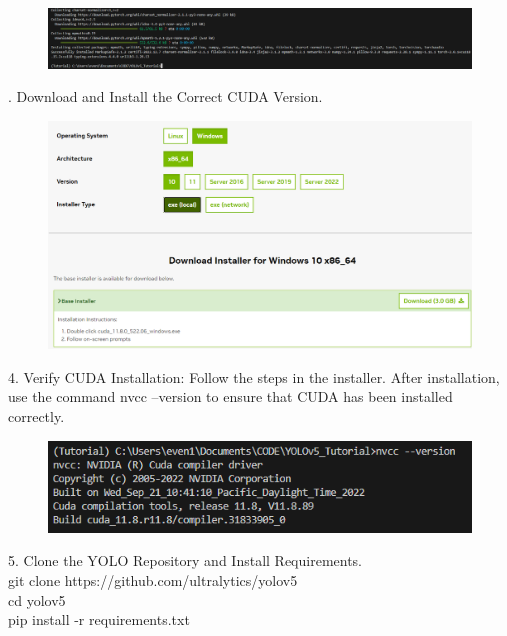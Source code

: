 \begin{figure}[H]
    \centering
    \includegraphics[scale=0.5]{evenbilder/tutorial/tutorial-3.png}
    \label{fig:tutorial-3}
\end{figure}
.	Download and Install the Correct CUDA Version.\\

\begin{figure}[H]
    \centering
    \includegraphics[scale=0.5]{evenbilder/tutorial/tutorial-4.png}
    \label{fig:tutorial-4}
\end{figure}

4.	Verify CUDA Installation: Follow the steps in the installer. After installation, use the command nvcc --version to ensure that CUDA has been installed correctly.\\

\begin{figure}[H]
    \centering
    \includegraphics[scale=0.5]{evenbilder/tutorial/tutorial-5.png}
    \label{fig:tutorial-5}
\end{figure}

5.	Clone the YOLO Repository and Install Requirements.\\

git clone https://github.com/ultralytics/yolov5  \\
cd yolov5\\
pip install -r requirements.txt  \\

